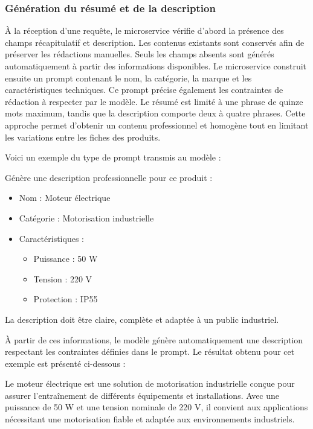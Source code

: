 \subsubsection{Génération du résumé et de la description}

À la réception d'une requête, le microservice vérifie d'abord la présence des champs récapitulatif et description. Les contenus existants sont conservés afin de préserver les rédactions manuelles. Seuls les champs absents sont générés automatiquement à partir des informations disponibles. Le microservice construit ensuite un prompt contenant le nom, la catégorie, la marque et les caractéristiques techniques. 
\newpage
Ce prompt précise également les contraintes de rédaction à respecter par le modèle. Le résumé est limité à une phrase de quinze mots maximum, tandis que la description comporte deux à quatre phrases. Cette approche permet d'obtenir un contenu professionnel et homogène tout en limitant les variations entre les fiches des produits.

Voici un exemple du type de prompt transmis au modèle :

\begin{tcolorbox}[
    colback=gray!5,
    colframe=black,
    title=Exemple de prompt envoyé au modèle,
    fonttitle=\bfseries
]
Génère une description professionnelle pour ce produit :

\begin{itemize}
    \item Nom : Moteur électrique
    \item Catégorie : Motorisation industrielle
    \item Caractéristiques :
    \begin{itemize}
        \item Puissance : 50 W
        \item Tension : 220 V
        \item Protection : IP55
    \end{itemize}
\end{itemize}

La description doit être claire, complète et adaptée à un public industriel.
\end{tcolorbox}

À partir de ces informations, le modèle génère automatiquement une description respectant les contraintes définies dans le prompt. Le résultat obtenu pour cet exemple est présenté ci-dessous :

\begin{tcolorbox}[
    colback=gray!5,
    colframe=black,
    title=Résultat généré par le modèle,
    fonttitle=\bfseries
]
Le moteur électrique est une solution de motorisation industrielle conçue pour assurer l'entraînement de différents équipements et installations. Avec une puissance de 50 W et une tension nominale de 220 V, il convient aux applications nécessitant une motorisation fiable et adaptée aux environnements industriels. 
\end{tcolorbox}

